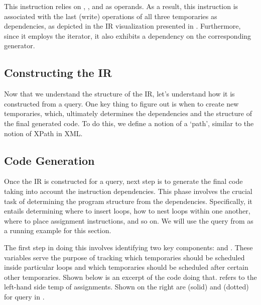\documentclass[runningheads]{llncs}
\begin{document}
This instruction relies on , , and  as operands.
As a result, this instruction is associated with the last (write) operations of all three
temporaries as dependencies, as depicted in the IR visualization presented in .
Furthermore, since it employs the  iterator, it also exhibits a dependency on the
corresponding generator.


\subsection{Constructing the IR}
Now that we understand the structure of the IR, let's understand how it is constructed
from a query.
One key thing to figure out is when to create new temporaries, which, ultimately
determines the dependencies and the structure of the final generated code.
To do this, we define a notion of a `path', similar to the notion of XPath in XML.





\subsection{Code Generation}
Once the IR is constructed for a query, next step is to generate the final code
taking into account the instruction dependencies.
This phase involves the crucial task of determining the program structure from
the dependencies.
Specifically, it entails determining where to insert loops, how to nest loops
within one another, where to place assignment instructions, and so on. 
We will use the query from  as a running example for this
section.

The first step in doing this involves identifying two key
components:  and .
These variables serve the purpose of tracking which temporaries should be scheduled
inside particular loops and which temporaries should be scheduled after
certain other temporaries.
Shown below is an excerpt of the code doing that.
 refers to the left-hand side temp of assignments.
Shown on the right are  (solid) and  (dotted)
for query in .
\end{document}
